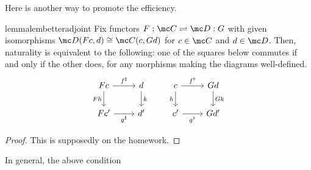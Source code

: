 Here is another way to promote the efficiency.
\begin{restatable}{lemma}{lembetteradjoint} \label{lem:betteradjoint}
	Fix functors $F:\mc C\rightleftharpoons\mc D:G$ with given isomorphisms $\mc D(Fc,d)\cong\mc C(c,Gd)$ for $c\in\mc C$ and $d\in\mc D$. Then, naturality is equivalent to the following: one of the squares below commutes if and only if the other does, for any morphisms making the diagrams well-defined.
	\[\begin{tikzcd}[ampersand replacement=\&]
		Fc \& d \& c \& Gd \\
		{Fc'} \& {d'} \& {c'} \& {Gd'}
		\arrow["{f^\sharp}", from=1-1, to=1-2]
		\arrow["{g^\sharp}"', from=2-1, to=2-2]
		\arrow["Fh"', from=1-1, to=2-1]
		\arrow["k", from=1-2, to=2-2]
		\arrow["h"', from=1-3, to=2-3]
		\arrow["{f^\flat}", from=1-3, to=1-4]
		\arrow["{g^\flat}"', from=2-3, to=2-4]
		\arrow["Gk", from=1-4, to=2-4]
	\end{tikzcd}\]
\end{restatable}
\begin{proof}
	This is supposedly on the homework.
\end{proof}
In general, the above condition

